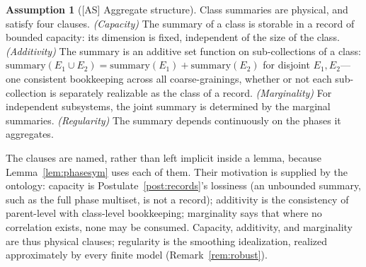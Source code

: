 \documentclass[11pt]{article}
\theoremstyle{definition}
\newtheorem{assumption}{Assumption}
\theoremstyle{remark}
\begin{document}
\begin{assumption}[{[AS]} Aggregate structure]\label{ass:as}
Class summaries are physical, and satisfy four clauses. \emph{(Capacity)} The summary of a class is storable in a record of bounded capacity: its dimension is fixed, independent of the size of the class. \emph{(Additivity)} The summary is an additive set function on sub-collections of a class: $\mathrm{summary}(E_1 \cup E_2) = \mathrm{summary}(E_1) + \mathrm{summary}(E_2)$ for disjoint $E_1, E_2$---one consistent bookkeeping across all coarse-grainings, whether or not each sub-collection is separately realizable as the class of a record. \emph{(Marginality)} For independent subsystems, the joint summary is determined by the marginal summaries. \emph{(Regularity)} The summary depends continuously on the phases it aggregates.

The clauses are named, rather than left implicit inside a lemma, because Lemma~\ref{lem:phasesym} uses each of them. Their motivation is supplied by the ontology: capacity is Postulate~\ref{post:records}'s lossiness (an unbounded summary, such as the full phase multiset, is not a record); additivity is the consistency of parent-level with class-level bookkeeping; marginality says that where no correlation exists, none may be consumed. Capacity, additivity, and marginality are thus physical clauses; regularity is the smoothing idealization, realized approximately by every finite model (Remark~\ref{rem:robust}).
\end{assumption}
\end{document}
